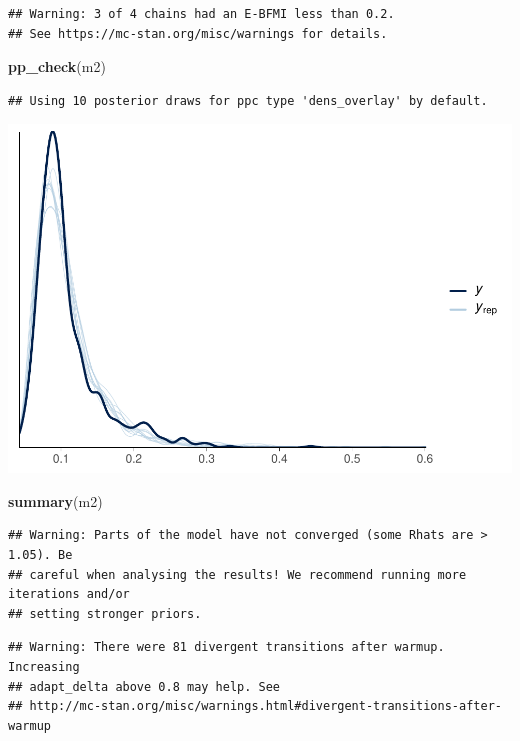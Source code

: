\documentclass[
]{article}
\newenvironment{Shaded}{\begin{snugshade}}{\end{snugshade}}
\newcommand{\FunctionTok}[1]{\textcolor[rgb]{0.13,0.29,0.53}{\textbf{#1}}}
\newcommand{\NormalTok}[1]{#1}
\begin{document}
\begin{verbatim}
## Warning: 3 of 4 chains had an E-BFMI less than 0.2.
## See https://mc-stan.org/misc/warnings for details.
\end{verbatim}

\begin{Shaded}
\begin{Highlighting}[]
\FunctionTok{pp\_check}\NormalTok{(m2)}
\end{Highlighting}
\end{Shaded}

\begin{verbatim}
## Using 10 posterior draws for ppc type 'dens_overlay' by default.
\end{verbatim}

\includegraphics{params_analyses_files/figure-latex/unnamed-chunk-3-2.pdf}

\begin{Shaded}
\begin{Highlighting}[]
\FunctionTok{summary}\NormalTok{(m2)}
\end{Highlighting}
\end{Shaded}

\begin{verbatim}
## Warning: Parts of the model have not converged (some Rhats are > 1.05). Be
## careful when analysing the results! We recommend running more iterations and/or
## setting stronger priors.
\end{verbatim}

\begin{verbatim}
## Warning: There were 81 divergent transitions after warmup. Increasing
## adapt_delta above 0.8 may help. See
## http://mc-stan.org/misc/warnings.html#divergent-transitions-after-warmup
\end{verbatim}
\end{document}
